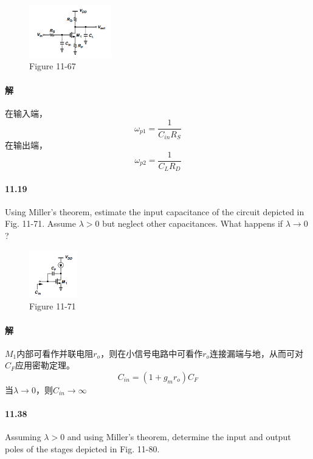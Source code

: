 \documentclass[hyperref, UTF8]{ctexart}
\newcommand{\under}[1]{\frac{1}{#1}}
\begin{document}
    \begin{figure}[!htb]
        \centering
        \includegraphics[width=0.319\textwidth]{p11-67.png}
        \caption*{Figure 11-67}
    \end{figure}

\paragraph{解}
    在输入端，
    $$\omega_{p1} = \under{C_{in}R_S}$$
    在输出端，
    $$\omega_{p2} = \under{C_LR_D}$$

\paragraph{11.19} \label{11.19}
    Using Miller's theorem, estimate the input capacitance of the circuit depicted in Fig. 11-71. Assume $\lambda > 0$ but neglect other capacitances. What happens if $\lambda \to 0$?

    \begin{figure}[!htb]
        \centering
        \includegraphics[width=0.187\textwidth]{p11-71.png}
        \caption*{Figure 11-71}
    \end{figure}

\paragraph{解}
    $M_1$内部可看作并联电阻$r_o$，则在小信号电路中可看作$r_o$连接漏端与地，从而可对$C_F$应用密勒定理。
    $$C_{in} = (1+g_mr_o)C_F$$
    当$\lambda \to 0$，则$C_{in} \to \infty$

\paragraph{11.38} \label{11.38}
    Assuming $\lambda > 0$ and using Miller's theorem, determine the input and output poles of the stages depicted in Fig. 11-80.
\end{document}

